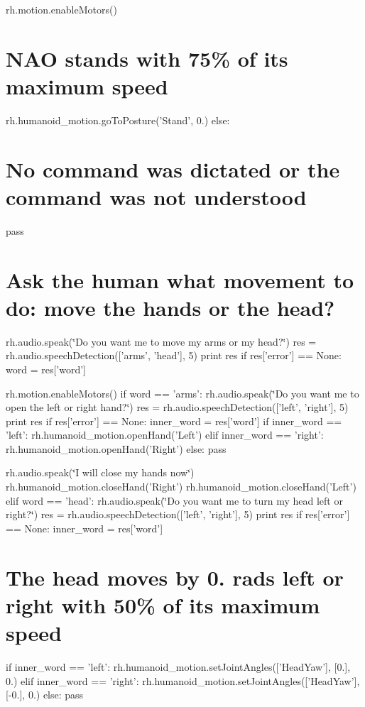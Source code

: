rh.\-motion.\-enable\-Motors() \section*{N\-A\-O stands with 75\% of its maximum speed}

rh.\-humanoid\-\_\-motion.\-go\-To\-Posture('Stand', 0.) else\-: \section*{No command was dictated or the command was not understood}

pass

\section*{Ask the human what movement to do\-: move the hands or the head?}

rh.\-audio.\-speak(\char`\"{}\-Do you want me to move my arms or my head?\char`\"{}) res = rh.\-audio.\-speech\-Detection(\mbox{[}'arms', 'head'\mbox{]}, 5) print res if res\mbox{[}'error'\mbox{]} == None\-: word = res\mbox{[}'word'\mbox{]}

rh.\-motion.\-enable\-Motors() if word == 'arms'\-: rh.\-audio.\-speak(\char`\"{}\-Do you want me to open the left or right hand?\char`\"{}) res = rh.\-audio.\-speech\-Detection(\mbox{[}'left', 'right'\mbox{]}, 5) print res if res\mbox{[}'error'\mbox{]} == None\-: inner\-\_\-word = res\mbox{[}'word'\mbox{]} if inner\-\_\-word == 'left'\-: rh.\-humanoid\-\_\-motion.\-open\-Hand('Left') elif inner\-\_\-word == 'right'\-: rh.\-humanoid\-\_\-motion.\-open\-Hand('Right') else\-: pass

rh.\-audio.\-speak(\char`\"{}\-I will close my hands now\char`\"{}) rh.\-humanoid\-\_\-motion.\-close\-Hand('Right') rh.\-humanoid\-\_\-motion.\-close\-Hand('Left') elif word == 'head'\-: rh.\-audio.\-speak(\char`\"{}\-Do you want me to turn my head left or right?\char`\"{}) res = rh.\-audio.\-speech\-Detection(\mbox{[}'left', 'right'\mbox{]}, 5) print res if res\mbox{[}'error'\mbox{]} == None\-: inner\-\_\-word = res\mbox{[}'word'\mbox{]} \section*{The head moves by 0. rads left or right with 50\% of its maximum speed}

if inner\-\_\-word == 'left'\-: rh.\-humanoid\-\_\-motion.\-set\-Joint\-Angles(\mbox{[}'Head\-Yaw'\mbox{]}, \mbox{[}0.\mbox{]}, 0.) elif inner\-\_\-word == 'right'\-: rh.\-humanoid\-\_\-motion.\-set\-Joint\-Angles(\mbox{[}'Head\-Yaw'\mbox{]}, \mbox{[}-\/0.\mbox{]}, 0.) else\-: pass

